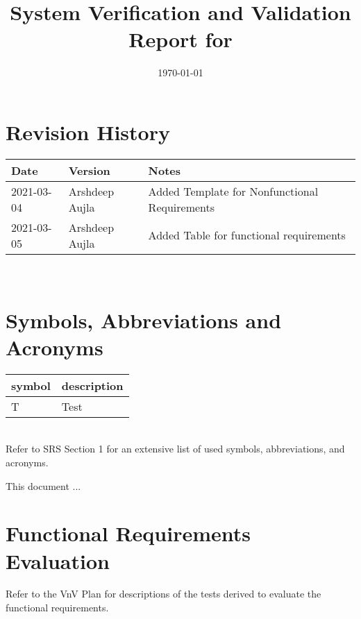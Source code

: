 \documentclass[12pt, titlepage]{article}
\begin{document}
\title{System Verification and Validation Report for \progname{}} 
\author{\authname}
\date{\today}
	
\maketitle


\section{Revision History}

\begin{tabularx}{\textwidth}{p{3cm}p{2cm}X}
\toprule {\bf Date} & {\bf Version} & {\bf Notes}\\
\midrule
2021-03-04 & Arshdeep Aujla & Added Template for Nonfunctional Requirements\\
2021-03-05 & Arshdeep Aujla & Added Table for functional requirements\\
\bottomrule
\end{tabularx}

~\newpage

\section{Symbols, Abbreviations and Acronyms}

\renewcommand{\arraystretch}{1.2}
\begin{tabular}{l l} 
  \toprule		
  \textbf{symbol} & \textbf{description}\\
  \midrule 
  T & Test\\
  \bottomrule
\end{tabular}\\

Refer to SRS Section 1 for an extensive list of used symbols, abbreviations, and acronyms.

\newpage

\tableofcontents

\listoftables %

\listoffigures %

\newpage


This document ...

\section{Functional Requirements Evaluation}
Refer to the VnV Plan for descriptions of the tests derived to evaluate the functional requirements.
\end{document}
